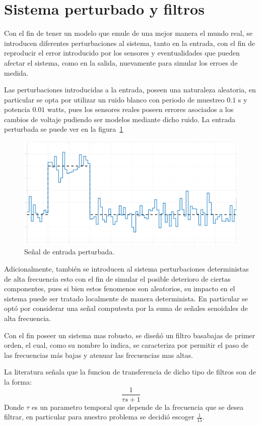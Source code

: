 \section{Sistema perturbado y filtros}
Con el fin de tener un modelo que emule de una mejor manera el mundo real,
se introducen diferentes perturbaciones al sistema, tanto en la
entrada, con el fin de reproducir el error introducido por los sensores
y eventualidades que pueden afectar el sistema, como en la salida, nuevamente
para simular los erroes de medida.

Las perturbaciones introducidas a la entrada, poseen una naturaleza aleatoria,
en particular se opta por utilizar un ruido blanco con periodo de
muestreo $0.1$ s y potencia $0.01$ watts, pues los sensores reales poseen errores
asociados a los cambios de voltaje pudiendo ser modelos mediante dicho ruido.
La entrada perturbada se puede ver en la figura~\ref{fig:entrada-ruido}

\begin{figure}[t]
  \label{fig:entrada-ruido}
  \includegraphics[scale=0.15]{Figuras/entrada}
  \caption{Señal de entrada perturbada.} 
\end{figure}

Adicionalmente, también se introducen al sistema perturbaciones deterministas
de alta frecuencia esto con el fin de simular el posible deterioro de ciertas
componentes, pues si bien estos fenomenos son aleatorios, su impacto en el sistema
puede ser tratado localmente de manera determinista. En particular se optó por
considerar una señal computesta por la suma de señales senoidales de alta frecuencia.

Con el fin poseer un sistema mas robusto, se diseñó un filtro basabajas de primer orden,
el cual, como su nombre lo indica, se caracteriza por permitir el paso de las frecuencias
más bajas y atenuar las frecuencias mas altas.

La literatura señala que la funcion de transferencia de dicho tipo de filtros
son de la forma:
\[
\frac{1}{\tau s + 1}
\]
Donde $\tau $ es un parametro temporal que depende de la frecuencia que se desea
filtrar, en particular para nuestro problema se decidió escoger $\frac{1}{15}$.

